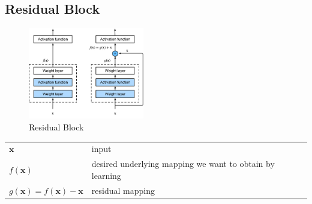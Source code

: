 \subsection{Residual Block \cite{dnn-1}} \label{Residual Block}

\begin{table}[H]
    \begin{minipage}{0.25\linewidth}
        \begin{figure}[H]
            \centering
            \includegraphics[width=\linewidth, height=4cm, keepaspectratio]{Pictures/convolutional-neural-network/residual-block.jpg}
            \caption{Residual Block}
        \end{figure}
    \end{minipage}
    \hfill
    \begin{minipage}{0.7\linewidth}
        \begin{customTableWrapper}{1.3}
            \begin{table}[H]
                \centering
                \begin{tabular}{l p{6cm}}
                    $\mathbf{x}$ & input \\
                    $f(\mathbf{x})$ & desired underlying mapping we want to obtain by learning\\
                    $g(\mathbf{x}) = f(\mathbf{x}) - \mathbf{x}$ & residual mapping
                \end{tabular}
            \end{table}
        \end{customTableWrapper}
    \end{minipage}
\end{table}

